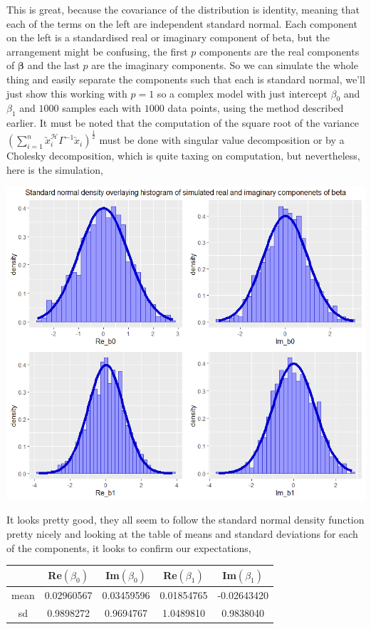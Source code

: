 \documentclass[honours,12pt]{unswthesis}
\newcommand{\ct}{\mathcal{H}}
\numberwithin{equation}{section}
\begin{document}
\noindent This is great, because the covariance of the distribution is identity, meaning that each of the terms on the left are independent standard normal. Each component on the left is a standardised real or imaginary component of beta, but the arrangement might be confusing, the first $p$ components are the real components of $\bm{\beta}$ and the last $p$ are the imaginary components. So we can simulate the whole thing and easily separate the components such that each is standard normal, we'll just show this working with $p = 1$ so a complex model with just intercept $\beta_{0}$ and $\beta_{1}$ and $1000$ samples each with $1000$ data points, using the method described earlier. It must be noted that the computation of the square root of the variance $\left( \sum_{i = 1}^{n} \utilde{x}_{i}^{\ct} \Gamma^{-1} \utilde{x}_{i} \right)^{\frac{1}{2}}$ must be done with singular value decomposition or by a Cholesky decomposition, which is quite taxing on computation, but nevertheless, here is the simulation,

\includegraphics[width = \textwidth]{graphics/samp1000n1000_coloured}

\noindent It looks pretty good, they all seem to follow the standard normal density function pretty nicely and looking at the table of means and standard deviations for each of the components, it looks to confirm our expectations,

\begin{center}
	\begin{tabular}{|c||c|c|c|c|}
	\hline
	& Re$(\beta_{0})$ & Im$(\beta_{0})$ & Re$(\beta_{1})$ & Im$(\beta_{1})$ \\
	\hline \hline
	mean & 0.02960567 & 0.03459596 & 0.01854765 & -0.02643420 \\
	\hline
	sd & 0.9898272 & 0.9694767 & 1.0489810 & 0.9838040 \\
	\hline
	\end{tabular}
\end{center}
\end{document}
